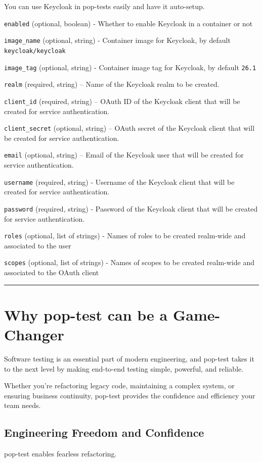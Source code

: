 \documentclass[11pt]{article}
\begin{document}
You can use Keycloak in pop-tests easily and have it auto-setup.

\texttt{enabled} (optional, boolean) - Whether to enable Keycloak in a container or not

\texttt{image\_name} (optional, string) - Container image for Keycloak, by default \texttt{keycloak/keycloak}

\texttt{image\_tag} (optional, string) - Container image tag for Keycloak, by default \texttt{26.1}

\texttt{realm} (required, string) – Name of the Keycloak realm to be created.

\texttt{client\_id} (required, string) – OAuth ID of the Keycloak client that will be created for service authentication.

\texttt{client\_secret} (optional, string) – OAuth secret  of the Keycloak client that will be created for service authentication.

\texttt{email}  (optional, string) – Email of the Keycloak user that will be created for service authentication.

\texttt{username} (required, string) - Username of the Keycloak client that will be created for service authentication.

\texttt{password} (required, string) - Password  of the Keycloak client that will be created for service authentication.

\texttt{roles} (optional, list of strings) - Names of roles to be created realm-wide and associated to the user

\texttt{scopes} (optional, list of strings) - Names of scopes to be created realm-wide and associated to the OAuth client



\noindent\rule{\textwidth}{0.5pt}

\section{Why pop-test can be a Game-Changer}
\label{sec:org36da6a9}

Software testing is an essential part of modern engineering, and pop-test takes it to the next level by making end-to-end testing simple, powerful, and reliable.

Whether you’re refactoring legacy code, maintaining a complex system, or ensuring business continuity, pop-test provides the confidence and efficiency your team needs.

\subsection{Engineering Freedom and Confidence}
\label{sec:org49a80d8}
pop-test enables fearless refactoring.
\end{document}
